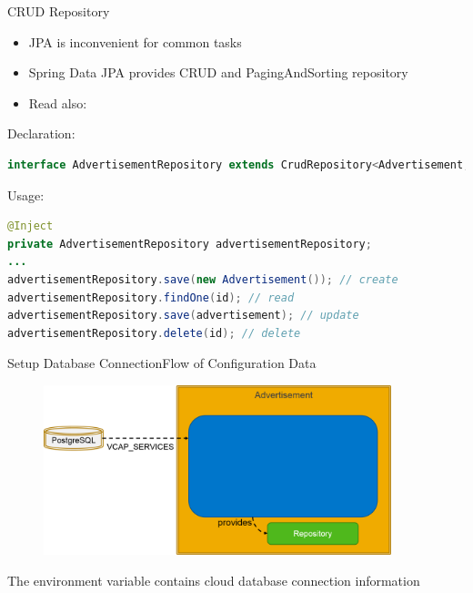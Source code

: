 \begin{frame}[fragile]{CRUD Repository}
\begin{itemize}
\item JPA is inconvenient for common tasks
\item Spring Data JPA provides CRUD and PagingAndSorting repository
\item Read also: 
\end{itemize}

\vspace{1cm}

Declaration:
\begin{lstlisting}[language=Java]
interface AdvertisementRepository extends CrudRepository<Advertisement, Long> {}
\end{lstlisting}

Usage:
\begin{lstlisting}[language=Java]
@Inject
private AdvertisementRepository advertisementRepository;
...
advertisementRepository.save(new Advertisement()); // create
advertisementRepository.findOne(id); // read
advertisementRepository.save(advertisement); // update
advertisementRepository.delete(id); // delete
\end{lstlisting}
\end{frame}

\begin{frame}{Setup Database Connection}{Flow of Configuration Data}
\begin{figure}
  	\includegraphics[width=0.9\textwidth]{../Z_ReuseImages/images/DBConnectionSetup_blackbox}
\end{figure}
{
\tiny
The environment variable  contains cloud database connection information
}
\end{frame}

